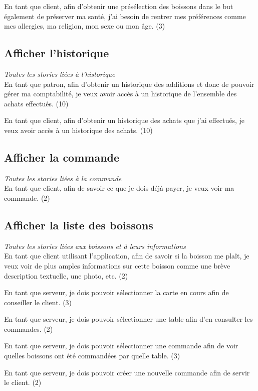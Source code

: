 \documentclass[10pt, a4, oneside, headings=normal]{scrartcl}
\begin{document}
En tant que client, afin d'obtenir une présélection des boissons dans le but également de préserver ma santé, j'ai besoin de rentrer mes préférences comme mes allergies, ma religion, mon sexe ou mon âge.  (3)

\subsection{Afficher l'historique}
\emph{Toutes les stories liées à l'historique} 
\\

En tant que patron, afin d'obtenir un historique des additions et donc de pouvoir gérer ma comptabilité, je veux avoir accès à un historique de l'ensemble des achats effectués. (10)

En tant que client, afin d'obtenir un historique des achats que j'ai effectués, je veux avoir accès à un historique des achats. (10)

\subsection{Afficher la commande}
\emph{Toutes les stories liées à la commande}
\\

En tant que client, afin de savoir ce que je dois déjà payer, je veux voir ma commande. (2)

\subsection{Afficher la liste des boissons}
\emph{Toutes les stories liées aux boissons et à leurs informations}
\\

En tant que client utilisant l'application, afin de savoir si la boisson me plaît, je veux voir de plus amples informations sur cette boisson comme une brève description textuelle, une photo, etc. (2)

En tant que serveur, je dois pouvoir sélectionner la carte en cours afin de conseiller le client. (3)

En tant que serveur, je dois pouvoir sélectionner une table afin d'en consulter les commandes. (2)

En tant que serveur, je dois pouvoir sélectionner une commande afin de voir quelles boissons ont été commandées par quelle table. (3)

En tant que serveur, je dois pouvoir créer une nouvelle commande afin de servir le client. (2)
\end{document}
